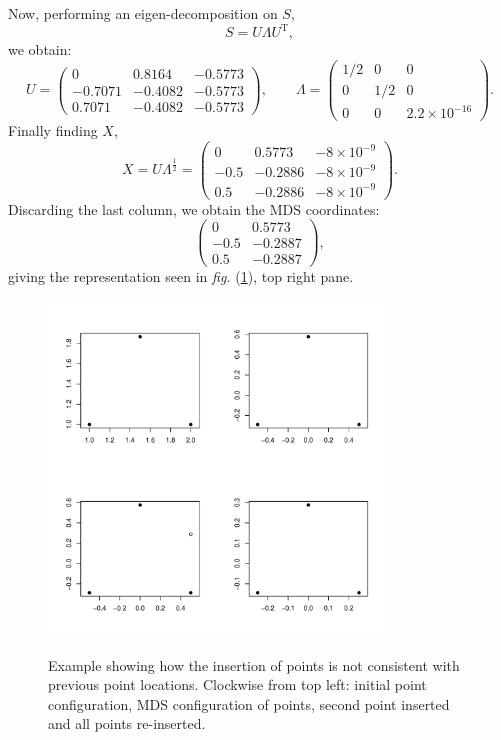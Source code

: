 \documentclass[a4paper,10pt]{article}
\newcommand{\fig}[1]{\emph{fig.} (\ref{#1})}
\newcommand{\cross}{\times}
\begin{document}
Now, performing an eigen-decomposition on $S$,
\begin{equation*}
S = U \Lambda U^\text{T},
\end{equation*}
we obtain:
\begin{equation*}
U = \begin{pmatrix} 
	0 & 0.8164 & -0.5773\\
	-0.7071 & -0.4082 & -0.5773\\ 
	0.7071 & -0.4082 & -0.5773
	\end{pmatrix},\qquad
\Lambda = \begin{pmatrix} 
	1/2 & 0 & 0\\
	0 & 1/2 & 0\\ 
	0 & 0 & 2.2\cross10^{-16}
\end{pmatrix}.
\end{equation*}
Finally finding $X$,
\begin{equation*}
X=U\Lambda^{\frac{1}{2}}= \begin{pmatrix} 
	0 & 0.5773 & -8\cross10^{-9}\\
	-0.5 & -0.2886 & -8\cross10^{-9}\\ 
	0.5 & -0.2886 & -8\cross10^{-9}
	\end{pmatrix}.
\end{equation*}
Discarding the last column, we obtain the MDS coordinates:
\begin{equation}
\begin{pmatrix} 
	0 & 0.5773\\
	-0.5 & -0.2887\\ 
	0.5 & -0.2887
	\end{pmatrix},
\label{origMDScoords}
\end{equation}
giving the representation seen in \fig{cexample}, top right pane.

\begin{figure}
\centering
\includegraphics[width=3.5in]{figs/cexample-fig.pdf} \\
\caption{Example showing how the insertion of points is not consistent with previous point locations. Clockwise from top left: initial point configuration, MDS configuration of points, second point inserted and all points re-inserted.}
\label{cexample}
\end{figure}
\end{document}

